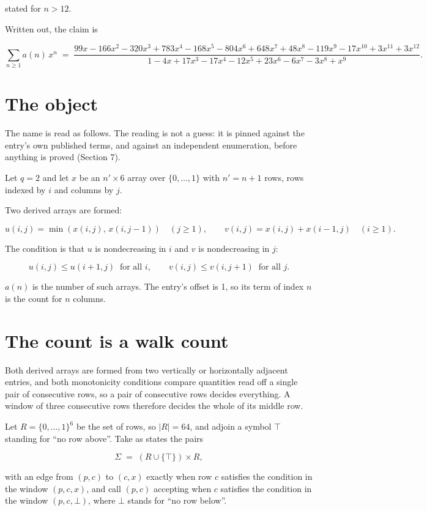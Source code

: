\documentclass[11pt]{article}
\theoremstyle{definition}
\begin{document}
stated for $n > 12$.

Written out, the claim is

\[\sum_{n \ge 1} a(n)\,x^n \;=\; \frac{99x - 166x^{2} - 320x^{3} + 783x^{4} - 168x^{5} - 804x^{6} + 648x^{7} + 48x^{8} - 119x^{9} - 17x^{10} + 3x^{11} + 3x^{12}}{1 - 4x + 17x^{3} - 17x^{4} - 12x^{5} + 23x^{6} - 6x^{7} - 3x^{8} + x^{9}}.\]

\section{The object}

The name is read as follows. The reading is not a guess: it is pinned against the entry's own published terms, and against an independent enumeration, before anything is proved (Section 7).

Let $q = 2$ and let $x$ be an $n' \times 6$ array over $\{0,\dots,1\}$ with $n' = n + 1$ rows, rows indexed by $i$ and columns by $j$.

Two derived arrays are formed:

\[u(i,j) = \min(x(i,j),\,x(i,j{-}1))\quad (j \ge 1), \qquad v(i,j) = x(i,j) + x(i{-}1,j)\quad (i \ge 1).\]

The condition is that $u$ is nondecreasing in $i$ and $v$ is nondecreasing in $j$:

\[u(i,j) \le u(i{+}1,j) \ \text{ for all } i, \qquad v(i,j) \le v(i,j{+}1) \ \text{ for all } j.\]

$a(n)$ is the number of such arrays. The entry's offset is 1, so its term of index $n$ is the count for $n$ columns.

\section{The count is a walk count}

Both derived arrays are formed from two vertically or horizontally adjacent entries, and both monotonicity conditions compare quantities read off a single pair of consecutive rows, so a pair of consecutive rows decides everything. A window of three consecutive rows therefore decides the whole of its middle row.

Let $R = \{0,\dots,1\}^{6}$ be the set of rows, so $|R| = 64$, and adjoin a symbol $\top$ standing for ``no row above''. Take as states the pairs

\[\Sigma \;=\; (R \cup \{\top\}) \times R,\]

with an edge from $(p,c)$ to $(c,x)$ exactly when row $c$ satisfies the condition in the window $(p,c,x)$, and call $(p,c)$ accepting when $c$ satisfies the condition in the window $(p,c,\bot)$, where $\bot$ stands for ``no row below''.
\end{document}
